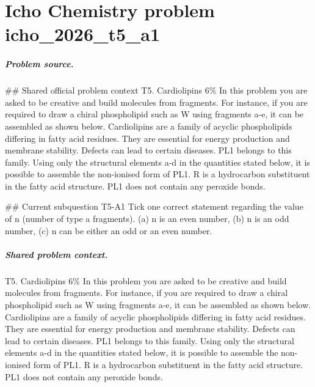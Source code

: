 
\chapter{Icho Chemistry problem icho\_2026\_t5\_a1}
\label{ch:IChO2026Problems_problem_icho_2026_t5_a1}

\paragraph{Problem source.}
\#\# Shared official problem context
T5. Cardiolipins 6\% In this problem you are asked to be creative and build molecules from fragments. For instance, if you are required to draw a chiral phospholipid such as W using fragments a-e, it can be assembled as shown below. Cardiolipins are a family of acyclic phospholipids differing in fatty acid residues. They are essential for energy production and membrane stability. Defects can lead to certain diseases. PL1 belongs to this family. Using only the structural elements a-d in the quantities stated below, it is possible to assemble the non-ionised form of PL1. R is a hydrocarbon substituent in the fatty acid structure. PL1 does not contain any peroxide bonds.

\#\# Current subquestion T5-A1
Tick one correct statement regarding the value of n (number of type a fragments). (a) n is an even number, (b) n is an odd number, (c) n can be either an odd or an even number.

\paragraph{Shared problem context.}
T5. Cardiolipins 6\% In this problem you are asked to be creative and build molecules from fragments. For instance, if you are required to draw a chiral phospholipid such as W using fragments a-e, it can be assembled as shown below. Cardiolipins are a family of acyclic phospholipids differing in fatty acid residues. They are essential for energy production and membrane stability. Defects can lead to certain diseases. PL1 belongs to this family. Using only the structural elements a-d in the quantities stated below, it is possible to assemble the non-ionised form of PL1. R is a hydrocarbon substituent in the fatty acid structure. PL1 does not contain any peroxide bonds.

